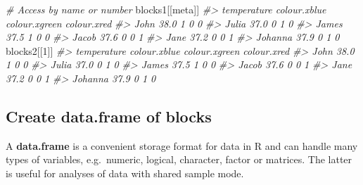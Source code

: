 \documentclass[
]{article}
\newenvironment{Shaded}{\begin{snugshade}}{\end{snugshade}}
\newcommand{\CommentTok}[1]{\textcolor[rgb]{0.56,0.35,0.01}{\textit{#1}}}
\newcommand{\DecValTok}[1]{\textcolor[rgb]{0.00,0.00,0.81}{#1}}
\newcommand{\NormalTok}[1]{#1}
\newcommand{\StringTok}[1]{\textcolor[rgb]{0.31,0.60,0.02}{#1}}
\begin{document}
\begin{Shaded}
\begin{Highlighting}[]
\CommentTok{\# Access by name or number}
\NormalTok{blocks1[[}\StringTok{\textquotesingle{}meta\textquotesingle{}}\NormalTok{]]}
\CommentTok{\#\textgreater{}         temperature colour.xblue colour.xgreen colour.xred}
\CommentTok{\#\textgreater{} John           38.0            1             0           0}
\CommentTok{\#\textgreater{} Julia          37.0            0             1           0}
\CommentTok{\#\textgreater{} James          37.5            1             0           0}
\CommentTok{\#\textgreater{} Jacob          37.6            0             0           1}
\CommentTok{\#\textgreater{} Jane           37.2            0             0           1}
\CommentTok{\#\textgreater{} Johanna        37.9            0             1           0}
\NormalTok{blocks2[[}\DecValTok{1}\NormalTok{]]}
\CommentTok{\#\textgreater{}         temperature colour.xblue colour.xgreen colour.xred}
\CommentTok{\#\textgreater{} John           38.0            1             0           0}
\CommentTok{\#\textgreater{} Julia          37.0            0             1           0}
\CommentTok{\#\textgreater{} James          37.5            1             0           0}
\CommentTok{\#\textgreater{} Jacob          37.6            0             0           1}
\CommentTok{\#\textgreater{} Jane           37.2            0             0           1}
\CommentTok{\#\textgreater{} Johanna        37.9            0             1           0}
\end{Highlighting}
\end{Shaded}

\hypertarget{create-data.frame-of-blocks}{%
\subsection{Create data.frame of
blocks}\label{create-data.frame-of-blocks}}

A \textbf{data.frame} is a convenient storage format for data in R and
can handle many types of variables, e.g.~numeric, logical, character,
factor or matrices. The latter is useful for analyses of data with
shared sample mode.
\end{document}
